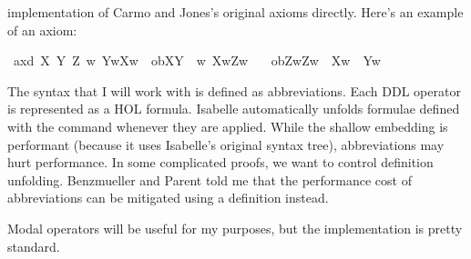 \begin{isabellebody}
\begin{isamarkuptext}
implementation of Carmo and Jones's original axioms directly. Here's an example of an axiom:%
\end{isamarkuptext}\isamarkuptrue%
\isanewline
{}\ ax{\isacharunderscore}{}d{\isacharcolon}\ {\isachardoublequoteopen}{\isasymforall}X\ Y\ Z{\isachardot}\ {\isacharparenleft}{\isacharparenleft}{\isasymforall}w{\isachardot}\ Y{\isacharparenleft}w{\isacharparenright}{\isasymlongrightarrow}X{\isacharparenleft}w{\isacharparenright}{\isacharparenright}\ {\isasymand}\ ob{\isacharparenleft}X{\isacharparenright}{\isacharparenleft}Y{\isacharparenright}\ {\isasymand}\ {\isacharparenleft}{\isasymforall}w{\isachardot}\ X{\isacharparenleft}w{\isacharparenright}{\isasymlongrightarrow}Z{\isacharparenleft}w{\isacharparenright}{\isacharparenright}{\isacharparenright}\ \isanewline
\ \ {\isasymlongrightarrow}ob{\isacharparenleft}Z{\isacharparenright}{\isacharparenleft}{\isasymlambda}w{\isachardot}{\isacharparenleft}Z{\isacharparenleft}w{\isacharparenright}\ {\isasymand}\ {\isasymnot}X{\isacharparenleft}w{\isacharparenright}{\isacharparenright}\ {\isasymor}\ Y{\isacharparenleft}w{\isacharparenright}{\isacharparenright}{\isachardoublequoteclose}\isanewline
%
\isanewline
%
\isadelimdocument
%
\endisadelimdocument
%
\isatagdocument
%
\isamarkuptrue%
%
\endisatagdocument
{\isafolddocument}%
%
\isadelimdocument
%
\endisadelimdocument
%
\begin{isamarkuptext}%
The syntax that I will work with is defined as abbreviations. Each DDL operator is represented 
as a HOL formula. Isabelle automatically unfolds formulae defined with the  command 
whenever they are applied. While the shallow embedding is performant (because it uses Isabelle's original 
syntax tree), abbreviations may hurt performance. In some complicated proofs, we want to control definition
unfolding. Benzmueller and Parent told me that the performance cost of abbreviations can 
be mitigated using a definition instead.%
\end{isamarkuptext}\isamarkuptrue%
%
\begin{isamarkuptext}%
Modal operators will be useful for my purposes, but the implementation is pretty standard.%

\end{isamarkuptext}
\end{isabellebody}
